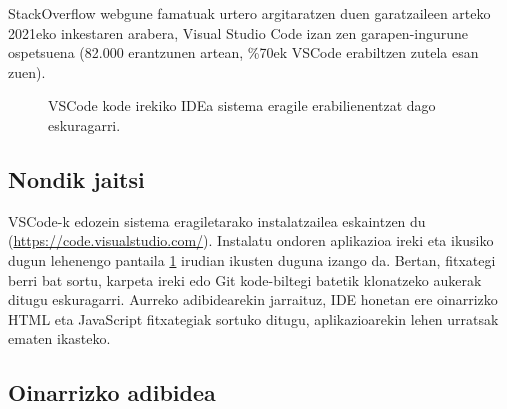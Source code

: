 StackOverflow webgune famatuak urtero argitaratzen duen garatzaileen arteko 2021eko inkestaren arabera, Visual Studio Code izan zen garapen-ingurune ospetsuena (82.000 erantzunen artean, \%70ek VSCode erabiltzen zutela esan zuen).

\begin{figure}[ht]
	\centering
{}
\caption{VSCode kode irekiko IDEa sistema eragile erabilienentzat dago eskuragarri.}
\label{fig:vscode1}
\end{figure}


\subsection{Nondik jaitsi}

VSCode-k edozein sistema eragiletarako instalatzailea eskaintzen du \newline 
(\href{https://code.visualstudio.com/}{https://code.visualstudio.com/}).
Instalatu ondoren aplikazioa ireki eta ikusiko dugun lehenengo pantaila \ref{fig:vscode1} irudian ikusten duguna izango da. Bertan, fitxategi berri bat sortu, karpeta ireki edo Git kode-biltegi batetik klonatzeko aukerak ditugu eskuragarri. Aurreko adibidearekin jarraituz, IDE honetan ere oinarrizko HTML eta JavaScript fitxategiak sortuko ditugu, aplikazioarekin lehen urratsak ematen ikasteko.

\subsection{Oinarrizko adibidea}


